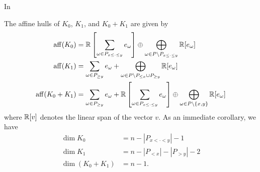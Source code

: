 \documentclass{puthesis-UG}
\begin{document}
In 

\begin{lem} \label{affine-hulls}
    The affine hulls of $K_0$, $K_1$, and $K_0 + K_1$ are given by 
    \begin{align*}
        \operatorname{aff} (K_0) & = \mathbb{R} \left [ \sum_{\omega \in P_{x \leq \cdot \leq y}} e_\omega \right ] \oplus \bigoplus_{\omega \in P \backslash P_{x \leq \cdot \leq y}} \mathbb{R}[e_\omega] \\
        \operatorname{aff} (K_1) & = \sum_{\omega \in P_{\geq y}} e_\omega + \bigoplus_{\omega \in P \backslash {P_{\leq x} \cup P_{\geq y}}} \mathbb{R}[e_\omega] \\
        \operatorname{aff} (K_0 + K_1) & = \sum_{\omega \in P_{\geq y}} e_\omega + \mathbb{R} \left [ \sum_{\omega \in P_{x \leq \cdot \leq y}} e_\omega \right ] \oplus \bigoplus_{\omega \in P \backslash \{x, y\}} \mathbb{R}[e_\omega]
    \end{align*}
    where $\mathbb{R}[v]$ denotes the linear span of the vector $v$. As an immediate corollary, we have
    \begin{align*}
        \dim K_0 & = n - |P_{x < \cdot < y}| - 1 \\
        \dim K_1 & = n - |P_{< x}| - |P_{> y}| - 2 \\
        \dim (K_0 + K_1) & = n-1.
    \end{align*}
\end{lem}
\end{document}
